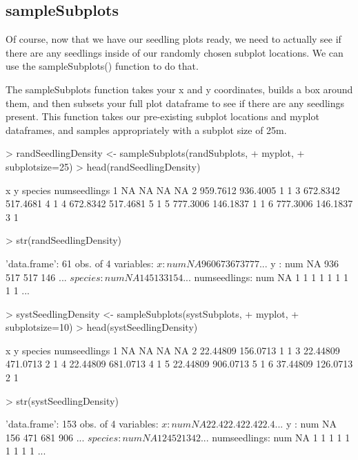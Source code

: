 \documentclass{article}
\begin{document}
\subsection{sampleSubplots}
Of course, now that we have our seedling plots ready, we need to actually see if there are any seedlings inside of our randomly chosen subplot locations. We can use the sampleSubplots() function to do that.

The sampleSubplots function takes your x and y coordinates, builds a box around them, and then subsets your full plot dataframe to see if there are any seedlings present. This function takes our pre-existing subplot locations and myplot dataframes, and samples appropriately with a subplot size of 25m.

\begin{Schunk}
\begin{Sinput}
> randSeedlingDensity <- sampleSubplots(randSubplots,
+                                       myplot,
+                                       subplotsize=25)
> head(randSeedlingDensity)
\end{Sinput}
\begin{Soutput}
         x        y species numseedlings
1       NA       NA      NA           NA
2 959.7612 936.4005       1            1
3 672.8342 517.4681       4            1
4 672.8342 517.4681       5            1
5 777.3006 146.1837       1            1
6 777.3006 146.1837       3            1
\end{Soutput}
\begin{Sinput}
> str(randSeedlingDensity)
\end{Sinput}
\begin{Soutput}
'data.frame':	61 obs. of  4 variables:
 $ x           : num  NA 960 673 673 777 ...
 $ y           : num  NA 936 517 517 146 ...
 $ species     : num  NA 1 4 5 1 3 3 1 5 4 ...
 $ numseedlings: num  NA 1 1 1 1 1 1 1 1 1 ...
\end{Soutput}
\begin{Sinput}
> systSeedlingDensity <- sampleSubplots(systSubplots,
+                                       myplot,
+                                       subplotsize=10)
> head(systSeedlingDensity)
\end{Sinput}
\begin{Soutput}
         x        y species numseedlings
1       NA       NA      NA           NA
2 22.44809 156.0713       1            1
3 22.44809 471.0713       2            1
4 22.44809 681.0713       4            1
5 22.44809 906.0713       5            1
6 37.44809 126.0713       2            1
\end{Soutput}
\begin{Sinput}
> str(systSeedlingDensity)
\end{Sinput}
\begin{Soutput}
'data.frame':	153 obs. of  4 variables:
 $ x           : num  NA 22.4 22.4 22.4 22.4 ...
 $ y           : num  NA 156 471 681 906 ...
 $ species     : num  NA 1 2 4 5 2 1 3 4 2 ...
 $ numseedlings: num  NA 1 1 1 1 1 1 1 1 1 ...
\end{Soutput}
\end{Schunk}
\end{document}
